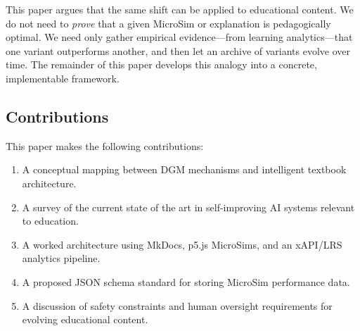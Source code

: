 This paper argues that the same shift can be applied to educational content.
We do not need to \textit{prove} that a given MicroSim or explanation is
pedagogically optimal. We need only gather empirical evidence---from learning
analytics---that one variant outperforms another, and then let an archive of
variants evolve over time. The remainder of this paper develops this analogy
into a concrete, implementable framework.

\subsection{Contributions}

This paper makes the following contributions:

\begin{enumerate}
    \item A conceptual mapping between DGM mechanisms and intelligent textbook
          architecture.
    \item A survey of the current state of the art in self-improving AI systems
          relevant to education.
    \item A worked architecture using MkDocs, p5.js MicroSims, and an
          xAPI/LRS analytics pipeline.
    \item A proposed JSON schema standard for storing MicroSim performance
          data.
    \item A discussion of safety constraints and human oversight requirements
          for evolving educational content.
\end{enumerate}
